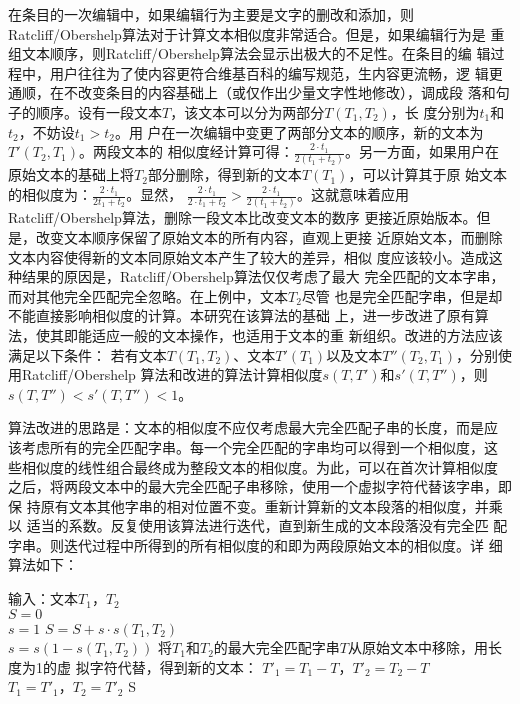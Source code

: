 在条目的一次编辑中，如果编辑行为主要是文字的删改和添加，则
Ratcliff/Obershelp算法对于计算文本相似度非常适合。但是，如果编辑行为是
重组文本顺序，则Ratcliff/Obershelp算法会显示出极大的不足性。在条目的编
辑过程中，用户往往为了使内容更符合维基百科的编写规范，生内容更流畅，逻
辑更通顺，在不改变条目的内容基础上（或仅作出少量文字性地修改），调成段
落和句子的顺序。设有一段文本$T$，该文本可以分为两部分$T(T_1,T_2)$，长
度分别为$t_1$和$t_2$，不妨设$t_1>t_2$。用
户在一次编辑中变更了两部分文本的顺序，新的文本为$T'(T_2,T_1)$。两段文本的
相似度经计算可得：$\frac{2 \cdot t_1}{2(t_1+t_2)}$。另一方面，如果用户在
原始文本的基础上将$T_2$部分删除，得到新的文本$T(T_1)$，可以计算其于原
始文本的相似度为：$\frac{2 \cdot t_1}{2t_1+t_2}$。显然，
$
\frac{2 \cdot t_1}{2 \cdot t_1+t_2}>\frac{2 \cdot t_1}{2(t_1+t_2)}
$。这就意味着应用Ratcliff/Obershelp算法，删除一段文本比改变文本的数序
更接近原始版本。但是，改变文本顺序保留了原始文本的所有内容，直观上更接
近原始文本，而删除文本内容使得新的文本同原始文本产生了较大的差异，相似
度应该较小。造成这种结果的原因是，Ratcliff/Obershelp算法仅仅考虑了最大
完全匹配的文本字串，而对其他完全匹配完全忽略。在上例中，文本$T_2$尽管
也是完全匹配字串，但是却不能直接影响相似度的计算。本研究在该算法的基础
上，进一步改进了原有算法，使其即能适应一般的文本操作，也适用于文本的重
新组织。改进的方法应该满足以下条件：
若有文本$T(T_1,T_2)$、文本$T'(T_1)$以及文本$T''(T_2,T_1)$，分别使用Ratcliff/Obershelp
  算法和改进的算法计算相似度$s(T,T')$和$s'(T,T'')$，则$s(T,T'')<s'(T,T'')<1$。

算法改进的思路是：文本的相似度不应仅考虑最大完全匹配子串的长度，而是应
该考虑所有的完全匹配字串。每一个完全匹配的字串均可以得到一个相似度，这
些相似度的线性组合最终成为整段文本的相似度。为此，可以在首次计算相似度
之后，将两段文本中的最大完全匹配子串移除，使用一个虚拟字符代替该字串，即保
持原有文本其他字串的相对位置不变。重新计算新的文本段落的相似度，并乘以
适当的系数。反复使用该算法进行迭代，直到新生成的文本段落没有完全匹
配字串。则迭代过程中所得到的所有相似度的和即为两段原始文本的相似度。详
细算法如下：
\begin{algorithm}
  \begin{algorithmic}
  \STATE 输入：文本$T_1$，$T_2$\\
\STATE $S=0$ \\
\STATE $s=1$
\STATE  $S=S+s \cdot s(T_1,T_2)$ \\
\STATE $s=s(1-s(T_1,T_2))$
\STATE 将$T_1$和$T_2$的最大完全匹配字串$T$从原始文本中移除，用长度为1的虚
拟字符代替，得到新的文本：
 $T'_1=T_1-T$，$T'_2=T_2-T$ \\
\STATE $T_1=T'_1$，$T_2=T'_2$
\ENDWHILE
\RETURN S
\end{algorithmic}
\end{algorithm}

